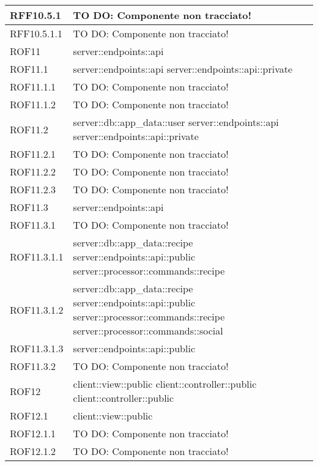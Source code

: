 \begin{center}
\begin{longtable}{| p{4cm} | p{8cm} |}
\hline
RFF10.5.1 & TO DO: Componente non tracciato! \\
\hline
RFF10.5.1.1 & TO DO: Componente non tracciato! \\
\hline
ROF11 & server::endpoints::api \\
\hline
ROF11.1 & server::endpoints::api \newline server::endpoints::api::private \\
\hline
ROF11.1.1 & TO DO: Componente non tracciato! \\
\hline
ROF11.1.2 & TO DO: Componente non tracciato! \\
\hline
ROF11.2 & server::db::app\_data::user \newline server::endpoints::api \newline server::endpoints::api::private \\
\hline
ROF11.2.1 & TO DO: Componente non tracciato! \\
\hline
ROF11.2.2 & TO DO: Componente non tracciato! \\
\hline
ROF11.2.3 & TO DO: Componente non tracciato! \\
\hline
ROF11.3 & server::endpoints::api \\
\hline
ROF11.3.1 & TO DO: Componente non tracciato! \\
\hline
ROF11.3.1.1 & server::db::app\_data::recipe \newline server::endpoints::api::public \newline server::processor::commands::recipe \\
\hline
ROF11.3.1.2 & server::db::app\_data::recipe \newline server::endpoints::api::public \newline server::processor::commands::recipe \newline server::processor::commands::social \\
\hline
ROF11.3.1.3 & server::endpoints::api::public \\
\hline
ROF11.3.2 & TO DO: Componente non tracciato! \\
\hline
ROF12 & client::view::public \newline client::controller::public \newline client::controller::public \\
\hline
ROF12.1 & client::view::public \\
\hline
ROF12.1.1 & TO DO: Componente non tracciato! \\
\hline
ROF12.1.2 & TO DO: Componente non tracciato! \\

\end{longtable}
\end{center}
